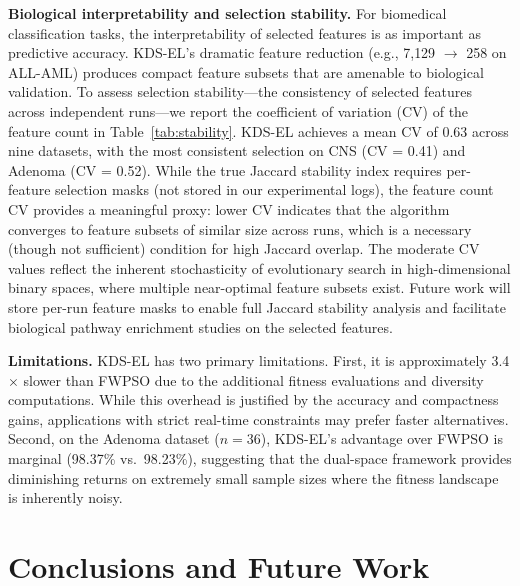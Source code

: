 \documentclass[a4paper,fleqn]{cas-dc}
\begin{document}
\begin{sloppypar}
	\par{
	\textbf{Biological interpretability and selection stability.}
	For biomedical classification tasks, the interpretability of
	selected features is as important as predictive accuracy.
	KDS-EL's dramatic feature reduction (e.g., 7{,}129 $\to$ 258 on
	ALL-AML) produces compact feature subsets that are amenable to
	biological validation.
	To assess selection stability---the consistency of selected
	features across independent runs---we report the coefficient of
	variation (CV) of the feature count in
	Table~\ref{tab:stability}.
	KDS-EL achieves a mean CV of 0.63 across nine datasets, with the
	most consistent selection on CNS (CV = 0.41) and Adenoma
	(CV = 0.52).
	While the true Jaccard stability index requires per-feature
	selection masks (not stored in our experimental logs), the feature
	count CV provides a meaningful proxy: lower CV indicates that the
	algorithm converges to feature subsets of similar size across runs,
	which is a necessary (though not sufficient) condition for high
	Jaccard overlap.
	The moderate CV values reflect the inherent stochasticity of
	evolutionary search in high-dimensional binary spaces, where
	multiple near-optimal feature subsets exist.
	Future work will store per-run feature masks to enable full
	Jaccard stability analysis and facilitate biological pathway
	enrichment studies on the selected features.
	}

	\par{
	\textbf{Limitations.}
	KDS-EL has two primary limitations.
	First, it is approximately 3.4$\times$ slower than FWPSO due to
	the additional fitness evaluations and diversity computations.
	While this overhead is justified by the accuracy and compactness
	gains, applications with strict real-time constraints may prefer
	faster alternatives.
	Second, on the Adenoma dataset ($n = 36$), KDS-EL's advantage over
	FWPSO is marginal (98.37\% vs.\ 98.23\%), suggesting that the
	dual-space framework provides diminishing returns on extremely
	small sample sizes where the fitness landscape is inherently noisy.
	}


	\section{Conclusions and Future Work}
	\label{sec:conclusion}


\end{sloppypar}
\end{document}
